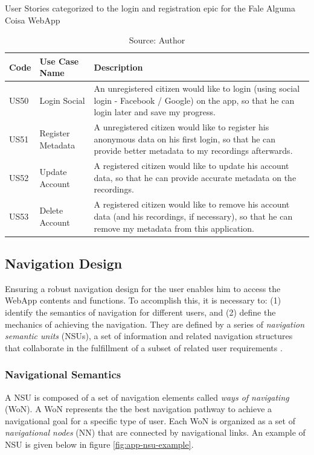 \begin{table}[h]
\caption{User Stories categorized to the login and registration epic for the Fale Alguma Coisa WebApp}
\label{tab:falealgumacoisa-simplified-login-and-registration}
\centering
\begin{tabular}{|p{1cm}|p{3cm}|p{10cm}|}
\hline
    Code & Use Case Name & Description \\ \hline
    US50 & Login Social & An unregistered citizen would like to login (using social login - Facebook / Google) on the app, so that he can login later and save my progress. \\ \hline
    US51 & Register Metadata & A unregistered citizen would like to register his anonymous data on his first login, so that he can provide better metadata to my recordings afterwards. \\ \hline
    US52 & Update Account & A registered citizen would like to update his account data, so that he can provide accurate metadata on the recordings. \\ \hline
    US53 & Delete Account & A registered citizen would like to remove his account data (and his recordings, if necessary), so that he can remove my metadata from this application. \\ \hline
\end{tabular}
\caption*{Source: Author}
\end{table}

\clearpage
\subsection{Navigation Design}
\label{sec:navigation-design}

Ensuring a robust navigation design for the user enables him to access the WebApp contents and functions. To accomplish this, it is necessary to: (1) identify the semantics of navigation for different users, and (2) define the mechanics of achieving the navigation. They are defined by a series of \textit{navigation semantic units} (NSUs), a set of information and related navigation structures that collaborate in the fulfillment of a subset of related user requirements \cite{conallen2003building}.

\subsubsection{Navigational Semantics}

A NSU is composed of a set of navigation elements called \textit{ways of navigating} (WoN). A WoN represents the the best navigation pathway to achieve a navigational goal for a specific type of user. Each WoN is organized as a set of \textit{navigational nodes} (NN) that are connected by navigational links. An example of NSU is given below in figure \ref{fig:app-nsu-example}.

